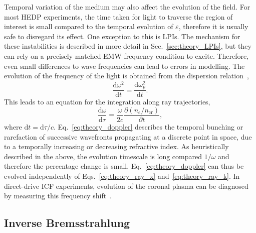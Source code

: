 Temporal variation of the medium may also affect the evolution of the field.
For most \ac{HEDP} experiments, the time taken for light to traverse the region of interest is small compared to the temporal evolution of $\varepsilon$, therefore it is usually safe to disregard its effect.
One exception to this is \ac{LPIs}.
The mechanism for these instabilities is described in more detail in Sec.~\ref{sec:theory_LPIs}, but they can rely on a precisely matched \ac{EMW} frequency condition to excite.
Therefore, even small differences to wave frequencies can lead to errors in modelling.
The evolution of the frequency of the light is obtained from the dispersion relation~\cite{dewandre_doppler_1981},
\begin{equation}
    \frac{\text{d}\omega^2}{\text{d}t} = \frac{\text{d}\omega_p^2}{\text{d}t}.
\end{equation}
This leads to an equation for the integration along ray trajectories,
\begin{equation}
    \label{eq:theory_doppler}
    \frac{\text{d} \omega}{\text{d} \tau}=\frac{\omega}{2 c} \frac{\partial\left(n_e / n_{\text{cr}}\right)}{\partial t},
\end{equation}
where $\text{d}t = \text{d}\tau/c$.
Eq.~\ref{eq:theory_doppler} describes the temporal bunching or rarefaction of successive wavefronts propagating at a discrete point in space, due to a temporally increasing or decreasing refractive index.
As heuristically described in the above, the evolution timescale is long compared $1/\omega$ and therefore the percentage change is small.
Eq.~\ref{eq:theory_doppler} can thus be evolved independently of Eqs.~\ref{eq:theory_ray_x} and~\ref{eq:theory_ray_k}.
In direct-drive \ac{ICF} experiments, evolution of the coronal plasma can be diagnosed by measuring this frequency shift~\cite{seka_timeresolved_2008}.

\subsection{Inverse Bremsstrahlung}%
\label{sec:theory_in_brem}

